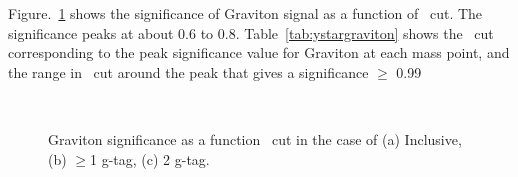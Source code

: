 Figure.~\ref{fig: graviton significance as a function of y* cut} shows the significance of Graviton signal as a function of \ystar\ cut. The significance peaks at about 0.6 to 0.8. Table~\ref{tab:ystargraviton} shows the \ystar\ cut corresponding to the peak significance value for Graviton at each mass point, and the range in \ystar\ cut around the peak that gives a significance $\geq$ 0.99
\begin{figure}[!htb]
        \centering
        \\
        \caption{Graviton significance as a function \ystar\ cut in the case of (a) Inclusive, (b) $\geq$1 g-tag, (c) 2 g-tag.}
        \label{fig: graviton significance as a function of y* cut}
\end{figure}


